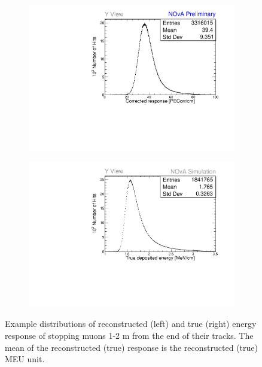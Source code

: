 \begin{figure}[!hbtp]
\centering
\begin{subfigure}[b]{0.495\textwidth}
\centering
\includegraphics[width=\textwidth]{PlotsTBCalibTechnote/Period4_meu_y_NOvAPlotStyle.pdf}
\end{subfigure}
\begin{subfigure}[b]{0.495\textwidth}
\centering
\includegraphics[width=\textwidth]{PlotsTBCalibTechnote/Simulation_mev_y_NOvAPlotStyle.pdf}
\end{subfigure}
\caption{Example distributions of reconstructed (left) and true (right) energy response of stopping muons 1-2 m from the end of their tracks. The mean of the reconstructed (true) response is the reconstructed (true) MEU unit.}
\label{fig:AbsCalibMEU}
\end{figure}

